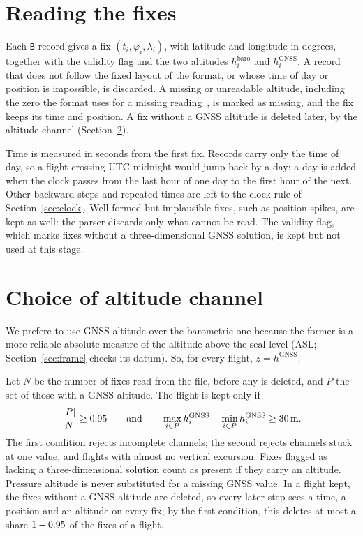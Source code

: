 \section{Reading the fixes}
\label{sec:parsing}

Each \texttt{B} record gives a fix $(t_i,\varphi_i,\lambda_i)$, with latitude and
longitude in degrees, together with the validity flag and the two altitudes
$h_i^{\mathrm{baro}}$ and $h_i^{\mathrm{GNSS}}$. A record that does not follow the
fixed layout of the format, or whose time of day or position is impossible, is
discarded. A missing or unreadable altitude,
including the zero the format uses for a missing reading~\cite{fai_igc_spec}, is marked as missing, and
the fix keeps its time and position. A fix without a GNSS altitude is deleted later, by
the altitude channel (Section~\ref{sec:altchannel}).

Time is measured in seconds from the first fix. Records carry only the time of day,
so a flight crossing UTC midnight would jump back by a day; a day is added when the
clock passes from the last hour of one day to the first hour of the next. Other
backward steps and repeated times are left to the clock rule of
Section~\ref{sec:clock}. Well-formed but implausible fixes, such as position spikes,
are kept as well: the parser discards only what cannot be read. The validity flag, which marks
fixes without a three-dimensional GNSS solution, is kept but not used at this stage.

\section{Choice of altitude channel}
\label{sec:altchannel}

We prefere to use GNSS altitude over the barometric one because the former is 
a more reliable absolute measure of the altitude above the seal level (ASL;
Section~\ref{sec:frame} checks its datum). So, for every flight, $z=h^{\mathrm{GNSS}}$.

Let $N$ be the number of fixes read from the file, before any is deleted, and $P$ the
set of those with a GNSS altitude. The flight is kept only if
\begin{equation}
  \frac{|P|}{N}\geq0.95
  \qquad\text{and}\qquad
  \max_{i\in P}h_i^{\mathrm{GNSS}}-\min_{i\in P}h_i^{\mathrm{GNSS}}\geq\SI{30}{\metre}.
  \label{eq:gnss-admission}
\end{equation}
The first condition rejects incomplete channels; the second rejects channels stuck at
one value, and flights with almost no vertical excursion. Fixes flagged as lacking a
three-dimensional solution count as present if they carry an altitude. Pressure
altitude is never substituted for a missing GNSS value. In a flight kept, the fixes
without a GNSS altitude are deleted, so every later step sees a time, a position and an
altitude on every fix; by the first condition, this deletes at most a share
$1-0.95$ of the fixes of a flight.

